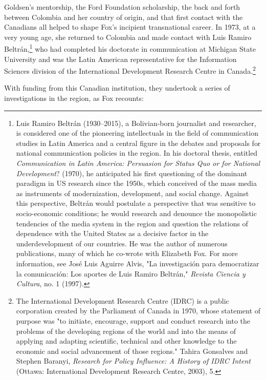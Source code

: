 \documentclass{tufte-handout}
\begin{document}
Goldsen's mentorship, the Ford Foundation scholarship, the back and
forth between Colombia and her country of origin, and that first contact
with the Canadians all helped to shape Fox's incipient transnational
career. In 1973, at a very young age, she returned to Colombia and made
contact with Luis Ramiro Beltrán,\footnote{Luis Ramiro Beltrán
  (1930--2015), a Bolivian-born journalist and researcher, is considered
  one of the pioneering intellectuals in the field of communication
  studies in Latin America and a central figure in the debates and
  proposals for national communication policies in the region. In his
  doctoral thesis, entitled \emph{Communication in Latin America:
  Persuasion for Status Quo or for National Development}? (1970), he
  anticipated his first questioning of the dominant paradigm in US
  research since the 1950s, which conceived of the mass media as
  instruments of modernization, development, and social change. Against
  this perspective, Beltrán would postulate a perspective that was
  sensitive to socio-economic conditions; he would research and denounce
  the monopolistic tendencies of the media system in the region and
  question the relations of dependence with the United States as a
  decisive factor in the underdevelopment of our countries. He was the
  author of numerous publications, many of which he co-wrote with
  Elizabeth Fox. For more information, see José Luis Aguirre Alvis, "La
  investigación para democratizar la comunicación: Los aportes de Luis
  Ramiro Beltrán," \emph{Revista Ciencia y Cultura}, no. 1 (1997).} who
had completed his doctorate in communication at Michigan State
University and was the Latin American representative for the Information
Sciences division of the International Development Research Centre in
Canada.\footnote{The International Development Research Centre (IDRC) is
  a public corporation created by the Parliament of Canada in 1970,
  whose statement of purpose was "to initiate, encourage, support and
  conduct research into the problems of the developing regions of the
  world and into the means of applying and adapting scientific,
  technical and other knowledge to the economic and social advancement
  of those regions." Tahira Gonsalves and Stephen Baranyi,
  \emph{Research for Policy Influence: A History of IDRC Intent}
  (Ottawa: International Development Research Centre, 2003), 5.}

With funding from this Canadian institution, they undertook a series of
investigations in the region, as Fox recounts:
\end{document}
